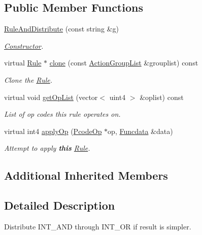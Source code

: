 \subsection*{Public Member Functions}
\begin{DoxyCompactItemize}
\item 
\mbox{\hyperlink{class_rule_and_distribute_a3495a0359ace14efb37ce9e31cc1cc9d}{Rule\+And\+Distribute}} (const string \&g)
\begin{DoxyCompactList}\small\item\em \mbox{\hyperlink{class_constructor}{Constructor}}. \end{DoxyCompactList}\item 
virtual \mbox{\hyperlink{class_rule}{Rule}} $\ast$ \mbox{\hyperlink{class_rule_and_distribute_a7c22fc9d5e1f837afb8b13a9cc83ddff}{clone}} (const \mbox{\hyperlink{class_action_group_list}{Action\+Group\+List}} \&grouplist) const
\begin{DoxyCompactList}\small\item\em Clone the \mbox{\hyperlink{class_rule}{Rule}}. \end{DoxyCompactList}\item 
virtual void \mbox{\hyperlink{class_rule_and_distribute_a002447d0c756541ef990d881d8244c49}{get\+Op\+List}} (vector$<$ uint4 $>$ \&oplist) const
\begin{DoxyCompactList}\small\item\em List of op codes this rule operates on. \end{DoxyCompactList}\item 
virtual int4 \mbox{\hyperlink{class_rule_and_distribute_aa40f49c92c7f7088f01ffedff4b5700e}{apply\+Op}} (\mbox{\hyperlink{class_pcode_op}{Pcode\+Op}} $\ast$op, \mbox{\hyperlink{class_funcdata}{Funcdata}} \&data)
\begin{DoxyCompactList}\small\item\em Attempt to apply {\bfseries{this}} \mbox{\hyperlink{class_rule}{Rule}}. \end{DoxyCompactList}\end{DoxyCompactItemize}
\subsection*{Additional Inherited Members}


\subsection{Detailed Description}
Distribute I\+N\+T\+\_\+\+A\+ND through I\+N\+T\+\_\+\+OR if result is simpler. 


